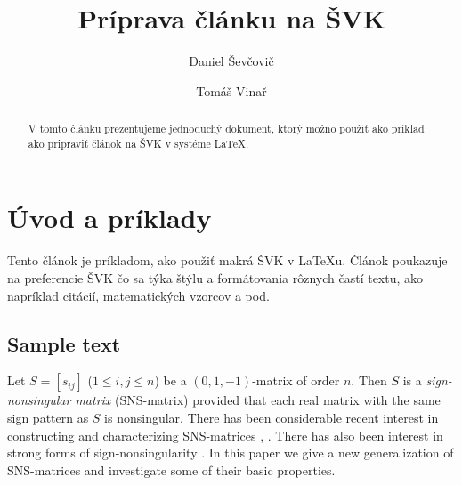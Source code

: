 \documentclass[slovensky]{svk}
\begin{document}
\title{Príprava článku na ŠVK}

\author{Daniel Ševčovič
\and 
Tomáš Vinař
}




\maketitle

\begin{abstract}
V tomto článku prezentujeme jednoduchý dokument, ktorý
možno použiť ako príklad ako pripraviť článok na ŠVK
v systéme \LaTeX.

\end{abstract}

\section{Úvod a príklady}
Tento článok je príkladom, ako použiť makrá ŠVK v \LaTeX{}u.
Článok poukazuje na preferencie ŠVK čo sa týka štýlu a formátovania
rôznych častí textu, ako napríklad citácií, matematických vzorcov
a pod. 

\subsection{Sample text}
Let $S=[s_{ij}]$ ($1\leq i,j\leq n$) be a $(0,1,-1)$-matrix
of order $n$. Then $S$ is a {\em sign-nonsingular matrix}
(SNS-matrix) provided that each real matrix with the same
sign pattern as $S$ is nonsingular. There has been
considerable recent interest in constructing and
characterizing SNS-matrices \cite{bs}, \cite{klm}. There
has also been interest in strong forms of
sign-nonsingularity \cite{djd}. In this paper we give a new
generalization of SNS-matrices and investigate some of
their basic properties.
 
\end{document}

